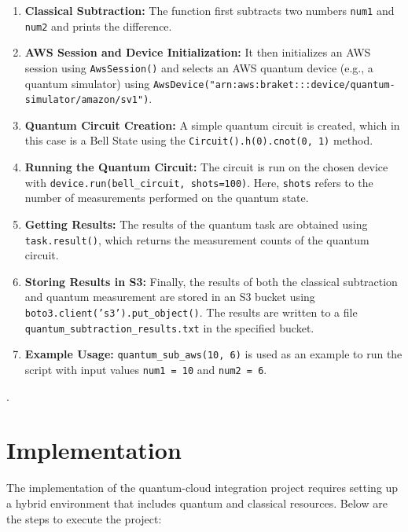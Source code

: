 \documentclass[12pt,a4paper]{article}
\begin{document}
\begin{enumerate}
    \item \textbf{Classical Subtraction:} The function first subtracts two numbers \texttt{num1} and \texttt{num2} and prints the difference.
    
    \item \textbf{AWS Session and Device Initialization:} It then initializes an AWS session using \texttt{AwsSession()} and selects an AWS quantum device (e.g., a quantum simulator) using \texttt{AwsDevice("arn:aws:braket:::device/quantum-simulator/amazon/sv1")}.
    
    \item \textbf{Quantum Circuit Creation:} A simple quantum circuit is created, which in this case is a Bell State using the \texttt{Circuit().h(0).cnot(0, 1)} method.
    
    \item \textbf{Running the Quantum Circuit:} The circuit is run on the chosen device with \texttt{device.run(bell\_circuit, shots=100)}. Here, \texttt{shots} refers to the number of measurements performed on the quantum state.
    
    \item \textbf{Getting Results:} The results of the quantum task are obtained using \texttt{task.result()}, which returns the measurement counts of the quantum circuit.
    
    \item \textbf{Storing Results in S3:} Finally, the results of both the classical subtraction and quantum measurement are stored in an S3 bucket using \texttt{boto3.client('s3').put\_object()}. The results are written to a file \texttt{quantum\_subtraction\_results.txt} in the specified bucket.
    
    \item \textbf{Example Usage:} \texttt{quantum\_sub\_aws(10, 6)} is used as an example to run the script with input values \texttt{num1 = 10} and \texttt{num2 = 6}.
\end{enumerate}

.

\begin{center}
    \fontsize{14}{16}\selectfont \bfseries
    \section{Implementation}
\end{center}

The implementation of the quantum-cloud integration project requires setting up a hybrid environment that includes quantum and classical resources. Below are the steps to execute the project:
\end{document}
